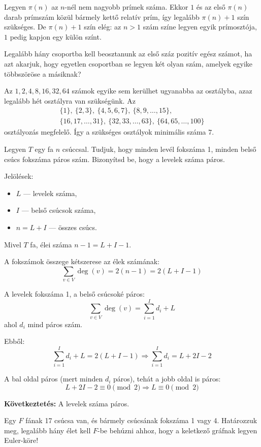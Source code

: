 \begin{solution}
Legyen $\pi(n)$ az $n$-nél nem nagyobb prímek száma. Ekkor $1$
és az első $\pi(n)$ darab prímszám közül bármely kettő relatív prím,
így legalább $\pi(n)+1$ szín szükséges. De $\pi(n)+1$ szín elég:
az $n>1$ szám színe legyen egyik prímosztója, $1$ pedig kapjon egy
külön színt. 
\end{solution}
\begin{extraproblem}
Legalább hány csoportba kell beosztanunk az első száz pozitív egész
számot, ha azt akarjuk, hogy egyetlen csoportban se legyen két olyan
szám, amelyek egyike többszöröse a másiknak? 
\end{extraproblem}

\begin{solution}
Az $1,2,4,8,16,32,64$ számok egyike sem kerülhet ugyanabba az osztályba,
azaz legalább hét osztályra van szükségünk. Az 
\begin{gather*}
\{1\},\ \{2,3\},\ \{4,5,6,7\},\ \{8,9,\ldots,15\},\\
\{16,17,\ldots,31\},\ \{32,33,\ldots,63\},\ \{64,65,\ldots,100\}
\end{gather*}
osztályozás megfelelő. Így a szükséges osztályok minimális száma $7$. 
\end{solution}
\begin{extraproblem}
Legyen $T$ egy fa $n$ csúccsal. Tudjuk, hogy minden levél fokszáma
1, minden belső csúcs fokszáma páros szám. Bizonyítsd be, hogy a levelek
száma páros. 
\end{extraproblem}

\begin{solution}
Jelölések: 
\begin{itemize}
\item $L$ --- levelek száma, 
\item $I$ --- belső csúcsok száma, 
\item $n=L+I$ --- összes csúcs. 
\end{itemize}
Mivel $T$ fa, élei száma $n-1=L+I-1$.

A fokszámok összege kétszerese az élek számának: 
\[
\sum_{v\in V}\deg(v)=2(n-1)=2(L+I-1)
\]

A levelek fokszáma 1, a belső csúcsoké páros: 
\[
\sum_{v\in V}\deg(v)=\sum_{i=1}^{I}d_{i}+L
\]
ahol $d_{i}$ mind páros szám.

Ebből: 
\[
\sum_{i=1}^{I}d_{i}+L=2(L+I-1)\Rightarrow\sum_{i=1}^{I}d_{i}=L+2I-2
\]

A bal oldal páros (mert minden $d_{i}$ páros), tehát a jobb oldal
is páros: 
\[
L+2I-2\equiv0\pmod 2\Rightarrow L\equiv0\pmod 2
\]

\bigskip{}

\textbf{Következtetés:} A levelek száma páros. 
\end{solution}
\begin{extraproblem}
Egy $F$ fának 17 csúcsa van, és bármely csúcsának fokszáma 1 vagy
4. Határozzuk meg, legalább hány élet kell $F$-be behúzni ahhoz,
hogy a keletkező gráfnak legyen Euler-köre! 
\end{extraproblem}

